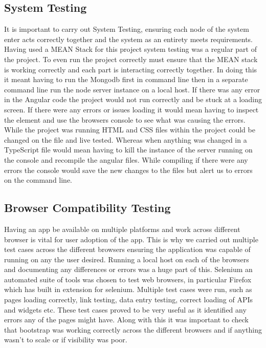 \subsection{System Testing}
It is important to carry out System Testing, ensuring each node of the system enter acts correctly together and the system as an entirety meets requirements. Having used a MEAN Stack for this project system testing was a regular part of the project. To even run the project correctly must ensure that the MEAN stack is working correctly and each part is interacting correctly together. In doing this it meant having to run the Mongodb first in command line then in a separate command line run the node server instance on a local host. If there was any error in the Angular code the project would not run correctly and be stuck at a loading screen. If there were any errors or issues loading it would mean having to inspect the element and use the browsers console to see what was causing the errors. While the project was running HTML and CSS files within the project could be changed on the file and live tested. Whereas when anything was changed in a TypeScript file would mean having to kill the instance of the server running on the console and recompile the angular files. While compiling if there were any errors the console would save the new changes to the files but alert us to errors on the command line. 

\subsection{Browser Compatibility Testing}
Having an app be available on multiple platforms and work across different browser is vital for user adoption of the app. This is why we carried out multiple test cases across the different browsers ensuring the application was capable of running on any the user desired. Running a local host on each of the browsers and documenting any differences or errors was a huge part of this. Selenium an automated suite of tools was chosen to test web browsers, in particular Firefox which has built in extension for selenium. Multiple test cases were run, such as pages loading correctly, link testing, data entry testing, correct loading of APIs and widgets etc. These test cases proved to be very useful as it identified any errors any of the pages might have. Along with this it was important to check that bootstrap was working correctly across the different browsers and if anything wasn't to scale or if visibility was poor.

